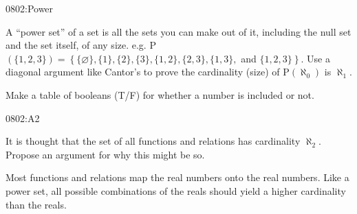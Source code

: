 \begin{defproblem}{0802:Power}
\begin{onlyproblem}
A ``power set'' of a set is all the sets you can make out of it, including the null set and the set
itself, of any size.  e.g. P$(\{1,2,3\}) = \left\{\{\varnothing\}, \{1\}, \{2\}, \{3\}, \{1,2\}, \{2,3\}, \{1,3\},\right.$
and $\left.\{1,2,3\}\right\}$.
Use a diagonal argument like Cantor's to prove the cardinality (size) of P$(\aleph_0)$ is $\aleph_1$.
\end{onlyproblem}
\begin{onlysolution}
Make a table of booleans (T/F) for whether a number is included or not.
\end{onlysolution}
\end{defproblem}




\begin{defproblem}{0802:A2}
\begin{onlyproblem}
It is thought that the set of all functions and relations has cardinality $\aleph_2$.  Propose
an argument for why this might be so.
\end{onlyproblem}
\begin{onlysolution}
Most functions and relations map the real numbers onto the real numbers.  Like a power set,
all possible combinations of the reals should yield a higher cardinality than the reals.
\end{onlysolution}
\end{defproblem}


\endinput
